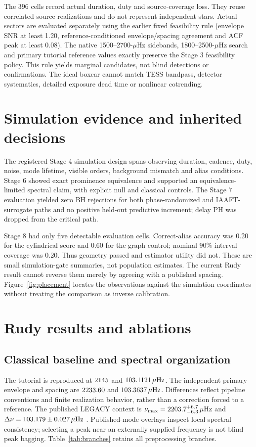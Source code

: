 \documentclass[11pt]{article}
\newcommand{\numax}{\nu_{\max}}
\newcommand{\dnu}{\Delta\nu}
\begin{document}
The 396 cells record actual duration, duty and source-coverage loss. They reuse
correlated source realizations and do not represent independent stars.
Actual sectors are evaluated separately using the earlier fixed feasibility
rule (envelope SNR at least 1.20, reference-conditioned envelope/spacing
agreement and ACF peak at least 0.08). The native 1500--2700-$\mu$Hz sidebands,
1800--2500-$\mu$Hz search and primary tutorial reference values exactly preserve
the Stage 3 feasibility policy. This rule yields marginal candidates,
not blind detections or confirmations. The ideal boxcar cannot match TESS
bandpass, detector systematics, detailed exposure dead time or nonlinear
cotrending.

\section{Simulation evidence and inherited decisions}
The registered Stage 4 simulation design spans observing duration, cadence,
duty, noise, mode lifetime, visible orders, background mismatch and alias
conditions. Stage 6 showed exact prominence equivalence and supported an
equivalence-limited spectral claim, with explicit null and classical controls.
The Stage 7 evaluation yielded zero BH rejections for both phase-randomized and
IAAFT-surrogate paths and no positive held-out predictive increment; delay PH
was dropped from the critical path.

Stage 8 had only five detectable evaluation cells. Correct-alias accuracy was
0.20 for the cylindrical score and 0.60 for the graph control; nominal
90\% interval coverage was 0.20. Thus geometry passed and estimator utility
did not. These are small simulation-gate summaries, not population estimates.
The current Rudy result cannot reverse them merely by agreeing with a published
spacing. Figure~\ref{fig:placement} locates the observations against the simulation
coordinates without treating the comparison as inverse calibration.

\section{Rudy results and ablations}
\subsection{Classical baseline and spectral organization}
The tutorial is reproduced at $2145$ and $103.1121\,\mu{\rm Hz}$.
The independent primary envelope and spacing are $2233.60$ and
$103.3637\,\mu{\rm Hz}$. Differences reflect pipeline conventions and finite
realization behavior, rather than a correction forced to a reference.
The published LEGACY context is
$\numax=2203.7^{+6.7}_{-6.3}\,\mu{\rm Hz}$ and
$\dnu=103.179\pm0.027\,\mu{\rm Hz}$ \citep{Lund2017}.
Published-mode overlays inspect local spectral consistency; selecting a peak
near an externally supplied frequency is not blind peak bagging.
Table~\ref{tab:branches} retains all preprocessing branches.
\end{document}
